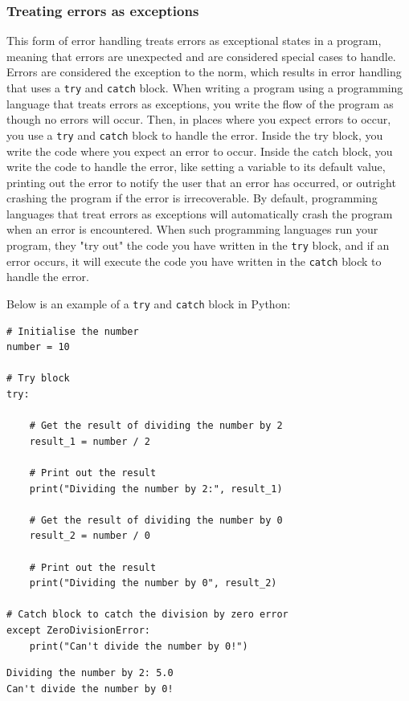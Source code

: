 \documentclass[11pt]{article}
\begin{document}
\subsubsection{Treating errors as exceptions}
\label{sec:org382299b}
This form of error handling treats errors as exceptional states
in a program, meaning that errors are unexpected
and are considered special cases to handle.
Errors are considered the exception to the norm,
which results in error handling that uses a \texttt{try} and \texttt{catch} block.
When writing a program using a programming language that
treats errors as exceptions, you write the flow of the program
as though no errors will occur. Then, in places where
you expect errors to occur, you use a \texttt{try} and \texttt{catch} block
to handle the error. Inside the try block, you write the code
where you expect an error to occur. Inside the catch block,
you write the code to handle the error, like setting a variable
to its default value, printing out the error to notify the user
that an error has occurred, or outright crashing the program
if the error is irrecoverable. By default, programming languages
that treat errors as exceptions will automatically crash the
program when an error is encountered. When such programming languages
run your program, they "try out" the code you have written
in the \texttt{try} block, and if an error occurs,
it will execute the code you have written in the \texttt{catch} block
to handle the error.

 \newpage

Below is an example of a \texttt{try} and \texttt{catch} block in Python:
\begin{verbatim}
# Initialise the number
number = 10

# Try block
try:

    # Get the result of dividing the number by 2
    result_1 = number / 2

    # Print out the result
    print("Dividing the number by 2:", result_1)

    # Get the result of dividing the number by 0
    result_2 = number / 0

    # Print out the result
    print("Dividing the number by 0", result_2)

# Catch block to catch the division by zero error
except ZeroDivisionError:
    print("Can't divide the number by 0!")
\end{verbatim}

\begin{verbatim}
Dividing the number by 2: 5.0
Can't divide the number by 0!
\end{verbatim}
\end{document}
